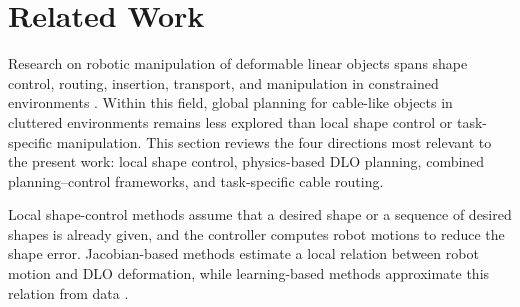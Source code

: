 \documentclass{pas}
\begin{document}




\section{Related Work}
\label{sec:related}

Research on robotic manipulation of deformable linear objects spans shape
control, routing, insertion, transport, and manipulation in constrained
environments \citep{Sanchez2018Survey,Yin2021Survey,Zhu2022ChallengesOutlook,
Caporali2026Survey}. Within this field, global planning for cable-like objects
in cluttered environments remains less explored than local shape control or
task-specific manipulation. This section reviews the four directions most
relevant to the present work: local shape control, physics-based DLO planning,
combined planning--control frameworks, and task-specific cable routing.

Local shape-control methods assume that a desired shape or a sequence of
desired shapes is already given, and the controller computes robot motions to
reduce the shape error. Jacobian-based methods estimate a local relation between
robot motion and DLO deformation, while learning-based methods approximate this
relation from data \citep{navarro2013model,
JinTomizuka2019CableManipulation,Lagneau2020ModelFreeWireServoing,
Lv2021CoordinatedFlexibleCables}.
\end{document}
